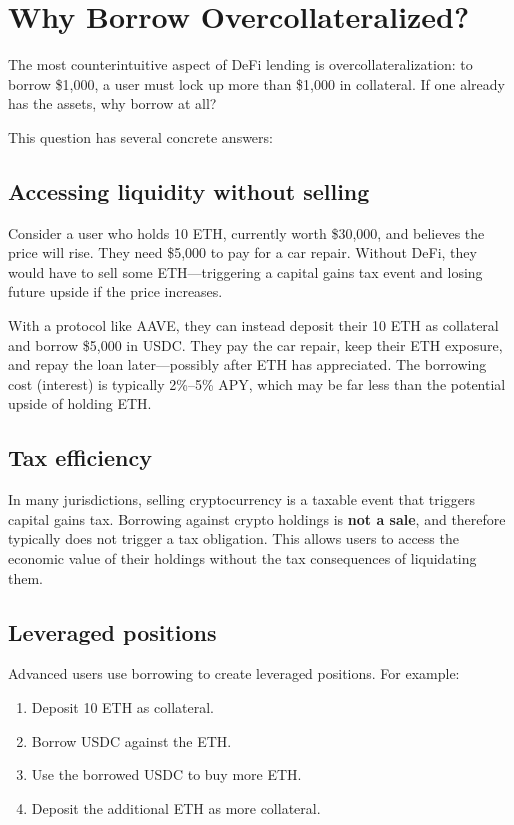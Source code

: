 \section{Why Borrow Overcollateralized?}

The most counterintuitive aspect of DeFi lending is overcollateralization: to borrow \$1,000, a user must lock up more than \$1,000 in collateral. If one already has the assets, why borrow at all?

This question has several concrete answers:

\subsection{Accessing liquidity without selling}

Consider a user who holds 10 ETH, currently worth \$30,000, and believes the price will rise. They need \$5,000 to pay for a car repair. Without DeFi, they would have to sell some ETH---triggering a capital gains tax event and losing future upside if the price increases.

With a protocol like AAVE, they can instead deposit their 10 ETH as collateral and borrow \$5,000 in USDC. They pay the car repair, keep their ETH exposure, and repay the loan later---possibly after ETH has appreciated. The borrowing cost (interest) is typically 2\%--5\% APY, which may be far less than the potential upside of holding ETH.

\subsection{Tax efficiency}

In many jurisdictions, selling cryptocurrency is a taxable event that triggers capital gains tax. Borrowing against crypto holdings is \textbf{not a sale}, and therefore typically does not trigger a tax obligation. This allows users to access the economic value of their holdings without the tax consequences of liquidating them.

\subsection{Leveraged positions}

Advanced users use borrowing to create leveraged positions. For example:
\begin{enumerate}
    \item Deposit 10 ETH as collateral.
    \item Borrow USDC against the ETH.
    \item Use the borrowed USDC to buy more ETH.
    \item Deposit the additional ETH as more collateral.
\end{enumerate}

